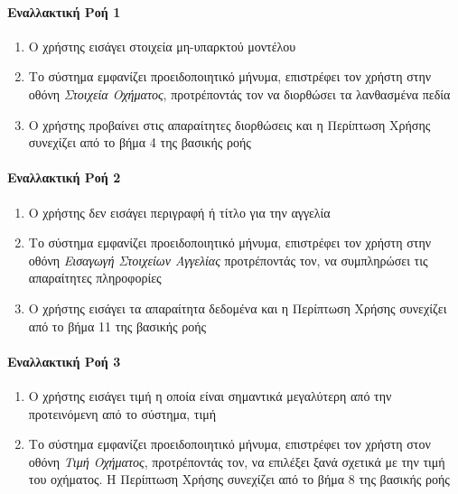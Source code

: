 \documentclass{../ol-softwaremanual}
\begin{document}
	\paragraph{Εναλλακτική Ροή 1}
	
	\begin{enumerate}
		\item O χρήστης εισάγει στοιχεία μη-υπαρκτού μοντέλου
		\item Το σύστημα εμφανίζει προειδοποιητικό μήνυμα, επιστρέφει τον χρήστη στην οθόνη \textit{Στοιχεία Οχήματος}, προτρέποντάς τον να διορθώσει τα λανθασμένα πεδία
		\item Ο χρήστης προβαίνει στις απαραίτητες διορθώσεις και η Περίπτωση Χρήσης συνεχίζει από το βήμα 4 της βασικής ροής
	\end{enumerate}
	
	\paragraph{Εναλλακτική Ροή 2}
	
	\begin{enumerate}
		\item Ο χρήστης δεν εισάγει περιγραφή ή τίτλο για την αγγελία
		\item Το σύστημα εμφανίζει προειδοποιητικό μήνυμα, επιστρέφει τον χρήστη στην οθόνη \textit{Εισαγωγή Στοιχείων Αγγελίας} προτρέποντάς τον, να συμπληρώσει τις απαραίτητες πληροφορίες
		\item Ο χρήστης εισάγει τα απαραίτητα δεδομένα και η Περίπτωση Χρήσης συνεχίζει από το βήμα 11 της βασικής ροής
	\end{enumerate}
	
	\paragraph{Εναλλακτική Ροή 3}
	
	\begin{enumerate}
		\item Ο χρήστης εισάγει τιμή η οποία είναι σημαντικά μεγαλύτερη από την προτεινόμενη από το σύστημα, τιμή
		\item Το σύστημα εμφανίζει προειδοποιητικό μήνυμα, επιστρέφει τον χρήστη στον οθόνη \textit{Τιμή Οχήματος}, προτρέποντάς τον, να επιλέξει ξανά σχετικά με την τιμή του οχήματος. Η Περίπτωση Χρήσης συνεχίζει από το βήμα 8 της βασικής ροής
	\end{enumerate}
	
	\newpage
	
\end{document}
